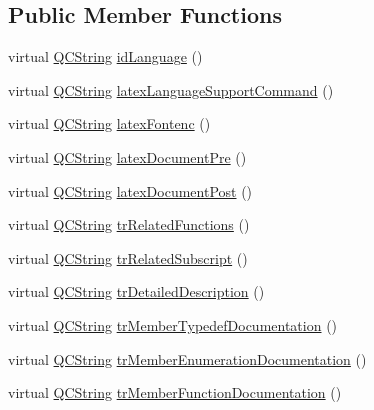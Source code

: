 \subsection*{Public Member Functions}
\begin{DoxyCompactItemize}
\item 
virtual \mbox{\hyperlink{class_q_c_string}{Q\+C\+String}} \mbox{\hyperlink{class_translator_chinesetraditional_a9bc148d1e1b9c00b90e35b935e3bd069}{id\+Language}} ()
\item 
virtual \mbox{\hyperlink{class_q_c_string}{Q\+C\+String}} \mbox{\hyperlink{class_translator_chinesetraditional_a61b66ec8d48398beab664080f41f30b0}{latex\+Language\+Support\+Command}} ()
\item 
virtual \mbox{\hyperlink{class_q_c_string}{Q\+C\+String}} \mbox{\hyperlink{class_translator_chinesetraditional_a98a1eb93c4d1ab29d05afcdef3ec33bc}{latex\+Fontenc}} ()
\item 
virtual \mbox{\hyperlink{class_q_c_string}{Q\+C\+String}} \mbox{\hyperlink{class_translator_chinesetraditional_a76884101bd57a4a09883de76da69aa3f}{latex\+Document\+Pre}} ()
\item 
virtual \mbox{\hyperlink{class_q_c_string}{Q\+C\+String}} \mbox{\hyperlink{class_translator_chinesetraditional_a50297eafc68fea68a1db8e384dfd415c}{latex\+Document\+Post}} ()
\item 
virtual \mbox{\hyperlink{class_q_c_string}{Q\+C\+String}} \mbox{\hyperlink{class_translator_chinesetraditional_aca72bb636f7b1d0f89ef3bf76a0ac3a0}{tr\+Related\+Functions}} ()
\item 
virtual \mbox{\hyperlink{class_q_c_string}{Q\+C\+String}} \mbox{\hyperlink{class_translator_chinesetraditional_a1e290a366815e1a6f81ab8f7ecb0e860}{tr\+Related\+Subscript}} ()
\item 
virtual \mbox{\hyperlink{class_q_c_string}{Q\+C\+String}} \mbox{\hyperlink{class_translator_chinesetraditional_ae444fc9b33fcfbf93481265d27ed7721}{tr\+Detailed\+Description}} ()
\item 
virtual \mbox{\hyperlink{class_q_c_string}{Q\+C\+String}} \mbox{\hyperlink{class_translator_chinesetraditional_a61aa7fe0392853be8c7db7243aa854de}{tr\+Member\+Typedef\+Documentation}} ()
\item 
virtual \mbox{\hyperlink{class_q_c_string}{Q\+C\+String}} \mbox{\hyperlink{class_translator_chinesetraditional_ac3b40e07275582cfee780a2d5b448e37}{tr\+Member\+Enumeration\+Documentation}} ()
\item 
virtual \mbox{\hyperlink{class_q_c_string}{Q\+C\+String}} \mbox{\hyperlink{class_translator_chinesetraditional_a777b4cf186ed3ac42c624183568fd61b}{tr\+Member\+Function\+Documentation}} ()

\end{DoxyCompactItemize}
